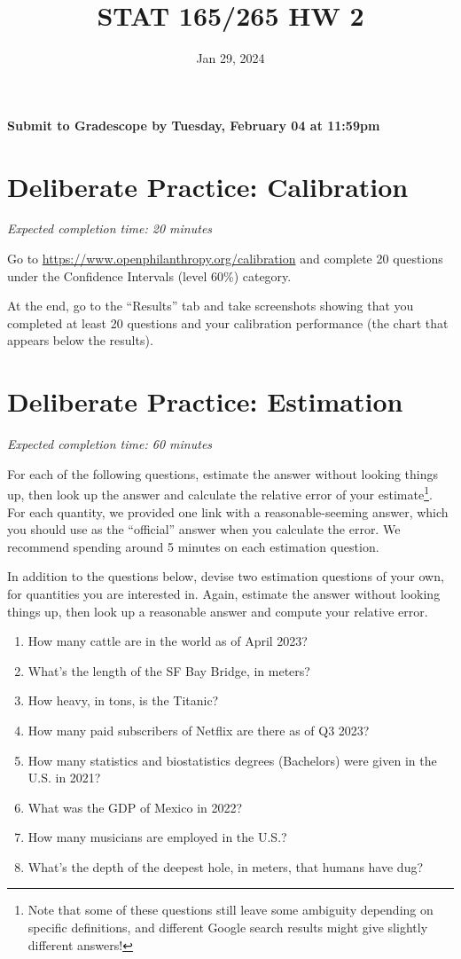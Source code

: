 \documentclass[11pt]{article}
\title{STAT 165/265 HW 2}
\date{Jan 29, 2024}
\begin{document}
\maketitle

\hfill \textbf{Submit to Gradescope by Tuesday, February 04 at 11:59pm}

\section*{Deliberate Practice: Calibration}

\emph{Expected completion time: 20 minutes}

Go to \url{https://www.openphilanthropy.org/calibration} and complete 20 questions under the Confidence Intervals (level 60\%) category.

At the end, go to the ``Results'' tab and take screenshots showing that 
you completed at least 20 questions and your calibration 
performance (the chart that appears below the results).

\section*{Deliberate Practice: Estimation}

\emph{Expected completion time: 60 minutes}


For each of the following questions, estimate the answer without looking things up, then look up the answer and calculate the relative error of your estimate\footnote{Note that some of these questions still leave some ambiguity depending on specific definitions, and different Google search results might give slightly different answers!}. For each quantity, we provided one link with a reasonable-seeming answer, which you should use as the ``official'' answer when you calculate the error. We recommend spending around 5 minutes on each estimation question. 

In addition to the questions below, devise two estimation questions of your own, for quantities you are interested in. Again, estimate the answer without looking things up, then look up a reasonable answer and compute your relative error.

\begin{enumerate}
	\item How many cattle are in the world as of April 2023? 
	\item What's the length of the SF Bay Bridge, in meters? 
	\item How heavy, in tons, is the Titanic? 
	\item How many paid subscribers of Netflix are there as of Q3 2023?
	\item How many statistics and biostatistics degrees (Bachelors) were given in the U.S. in 2021? 
	\item What was the GDP of Mexico in 2022? 
	\item How many musicians are employed in the U.S.?
	\item What's the depth of the deepest hole, in meters, that humans have dug? 
\end{enumerate}
\end{document}
